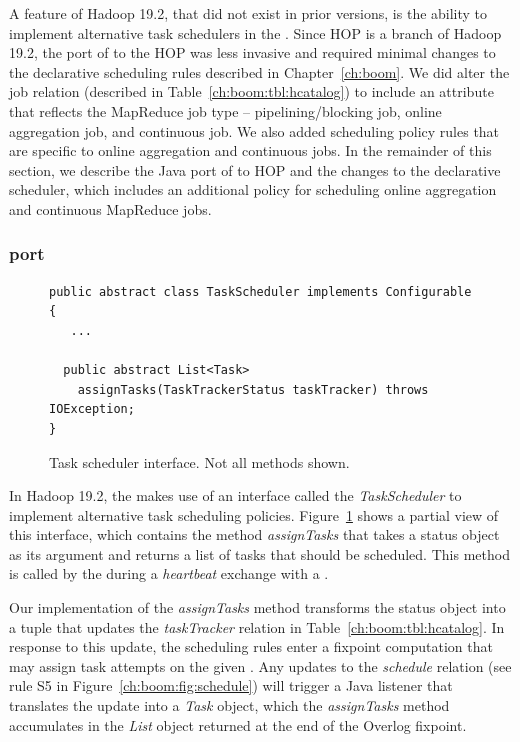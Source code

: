A feature of Hadoop 19.2, that did not exist in prior versions, is the ability to implement alternative task schedulers
in the \JT. Since HOP is a branch of Hadoop 19.2, the port of \JOL to the HOP \JT was less invasive and required 
minimal changes to the declarative scheduling rules described in Chapter~\ref{ch:boom}. We did alter the job
relation (described in Table~\ref{ch:boom:tbl:hcatalog}) to include an attribute that reflects the MapReduce job type -- 
pipelining/blocking job, online aggregation job, and continuous job. We also added scheduling policy rules that are 
specific to online aggregation and continuous jobs. In the remainder of this section, we describe the Java port of \JOL 
to HOP and the changes to the declarative scheduler, which includes an additional policy for scheduling online aggregation 
and continuous MapReduce jobs.

\subsubsection{\JOL port}
\begin{figure}[t]
\ssp
\begin{minipage}{\linewidth}
\centering
\begin{verbatim}
public abstract class TaskScheduler implements Configurable {
   ...
   
  public abstract List<Task> 
  	assignTasks(TaskTrackerStatus taskTracker) throws IOException;
}
\end{verbatim}
\end{minipage}
\caption{Task scheduler interface. Not all methods shown.}
\label{ch:hop:fig:taskscheduler}
\end{figure}


In Hadoop 19.2, the \JT makes use of an interface called the {\em TaskScheduler} to implement alternative task
scheduling policies. Figure~\ref{ch:hop:fig:taskscheduler} shows a partial view of this interface, which contains the
method {\em assignTasks} that takes a \TT status object as its argument and returns a list of tasks that should be 
scheduled. This method is called by the \JT during a {\em heartbeat} exchange with a \TT.  

Our implementation of the {\em assignTasks} method transforms the \TT status object into a tuple that updates the
{\em taskTracker} relation in Table~\ref{ch:boom:tbl:hcatalog}. In response to this update, the scheduling rules enter a 
fixpoint computation that may assign task attempts on the given \TT. Any updates to the {\em schedule} relation 
(see rule S5 in Figure~\ref{ch:boom:fig:schedule}) will trigger a Java listener that translates the update into a {\em Task} 
object, which the {\em assignTasks} method accumulates in the {\em List} object returned at the end of the Overlog fixpoint. 

